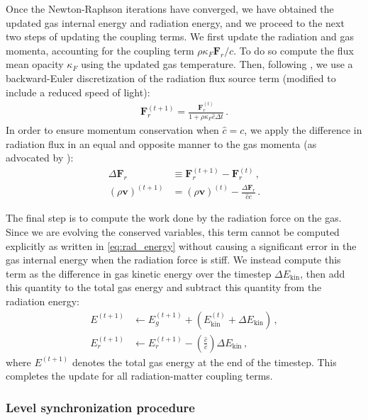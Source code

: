 \documentclass[fleqn,usenatbib]{mnras}
\newcommand{\vc}[1]{{\mathbf{#1}}}
\begin{document}
Once the Newton-Raphson iterations have converged, we have obtained the updated gas internal energy and radiation energy, and we proceed to the next two steps of updating the coupling terms. We first update the radiation and gas momenta, accounting for the coupling term $\rho \kappa_F \mathbf{F}_r/c$. To do so compute the flux mean opacity $\kappa_F$ using the updated gas temperature. Then, following \cite{Skinner_2019}, we use a backward-Euler discretization of the radiation flux source term (modified to include a reduced speed of light):
\begin{align}
\vc{F}_r^{(t+1)} = \frac{\vc{F}_r^{(t)}}{1 + \rho \kappa_F \hat c \Delta t} \, .
\end{align}
In order to ensure momentum conservation when $\hat c = c$, we apply the difference in radiation flux in an equal and opposite manner to the gas momenta (as advocated by \citealt{Skinner_2019}):
\begin{align}
\Delta \vc{F}_r &\equiv \vc{F}_r^{(t+1)} - \vc{F}_r^{(t)} \, , \\
{(\rho \vc{v})}^{(t+1)} &= {(\rho \vc{v})}^{(t)} - \frac{\Delta \vc{F}_r}{\hat c c} \, .
\end{align}

The final step is to compute the work done by the radiation force on the gas. Since we are evolving the conserved variables, this term cannot be computed explicitly as written in \autoref{eq:rad_energy} without causing a significant error in the gas internal energy when the radiation force is stiff. We instead compute this term as the difference in gas kinetic energy over the timestep $\Delta E_{\text{kin}}$, then add this quantity to the total gas energy and subtract this quantity from the radiation energy:
\begin{align}
E^{(t+1)} &\leftarrow E_g^{(t+1)} + \left( E_{\text{kin}}^{(t)} + \Delta E_{\text{kin}} \right) \, , \\
E_r^{(t+1)} &\leftarrow E_r^{(t+1)} - \left( \frac{\hat c}{c} \right) \Delta E_{\text{kin}} \, ,
\end{align}
where $E^{(t+1)}$ denotes the total gas energy at the end of the timestep. This completes the update for all radiation-matter coupling terms.


\subsubsection{Level synchronization procedure}
\label{sssec:sync}
\end{document}
